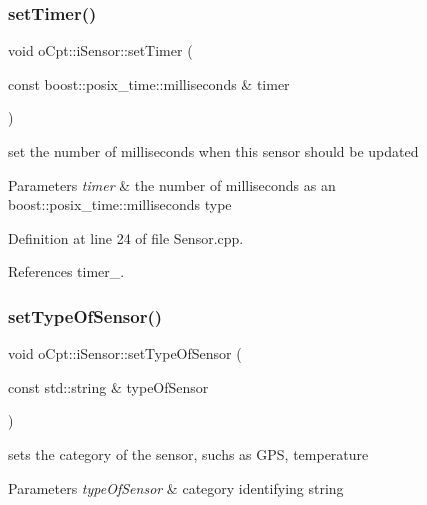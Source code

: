 \hypertarget{classo_cpt_1_1i_sensor_a4c956646ebf60201b5b23e0f5ad288ce}{}\label{classo_cpt_1_1i_sensor_a4c956646ebf60201b5b23e0f5ad288ce} 
\subsubsection{\texorpdfstring{set\+Timer()}{setTimer()}}
{\footnotesize\ttfamily void o\+Cpt\+::i\+Sensor\+::set\+Timer (\begin{DoxyParamCaption}\item[{const boost\+::posix\+\_\+time\+::milliseconds \&}]{timer }\end{DoxyParamCaption})}

set the number of milliseconds when this sensor should be updated 
\begin{DoxyParams}{Parameters}
{\em timer} & the number of milliseconds as an boost\+::posix\+\_\+time\+::milliseconds type \\
\hline
\end{DoxyParams}


Definition at line 24 of file Sensor.\+cpp.



References timer\+\_\+.

\hypertarget{classo_cpt_1_1i_sensor_ad1927865eb4ebfebc3dd840f66d98c1f}{}\label{classo_cpt_1_1i_sensor_ad1927865eb4ebfebc3dd840f66d98c1f} 
\subsubsection{\texorpdfstring{set\+Type\+Of\+Sensor()}{setTypeOfSensor()}}
{\footnotesize\ttfamily void o\+Cpt\+::i\+Sensor\+::set\+Type\+Of\+Sensor (\begin{DoxyParamCaption}\item[{const std\+::string \&}]{type\+Of\+Sensor }\end{DoxyParamCaption})}

sets the category of the sensor, suchs as G\+PS, temperature 
\begin{DoxyParams}{Parameters}
{\em type\+Of\+Sensor} & category identifying string \\
\hline
\end{DoxyParams}


